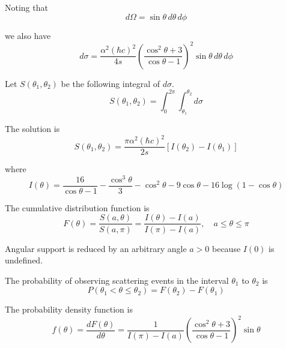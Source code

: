 Noting that
\begin{equation*}
d\Omega=\sin\theta\,d\theta\,d\phi
\end{equation*}

we also have
\begin{equation*}
d\sigma=\frac{\alpha^2(\hbar c)^2}{4s}
\left(\frac{\cos^2\theta+3}{\cos\theta-1}\right)^2
\sin\theta\,d\theta\,d\phi
\end{equation*}

Let $S(\theta_1,\theta_2)$ be the following integral of $d\sigma$.
\begin{equation*}
S(\theta_1,\theta_2)=\int_0^{2\pi}\int_{\theta_1}^{\theta_2}d\sigma
\end{equation*}

The solution is
\begin{equation*}
S(\theta_1,\theta_2)=\frac{\pi\alpha^2(\hbar c)^2}{2s}[I(\theta_2)-I(\theta_1)]
\end{equation*}

where
\begin{equation*}
I(\theta)=\frac{16}{\cos\theta-1}-\frac{\cos^3\theta}{3}-\cos^2\theta-9\cos\theta-16\log(1-\cos\theta)
\end{equation*}

The cumulative distribution function is
\begin{equation*}
F(\theta)
=\frac{S(a,\theta)}{S(a,\pi)}
=\frac{I(\theta)-I(a)}{I(\pi)-I(a)},
\quad
a\le\theta\le\pi
\end{equation*}

Angular support is reduced by an arbitrary angle $a>0$ because $I(0)$ is undefined.

\bigskip
The probability of observing scattering events in the interval $\theta_1$ to $\theta_2$ is
\begin{equation*}
P(\theta_1<\theta\le\theta_2)=F(\theta_2)-F(\theta_1)
\end{equation*}

The probability density function is
\begin{equation*}
f(\theta)=\frac{dF(\theta)}{d\theta}
=\frac{1}{I(\pi)-I(a)}
\left(\frac{\cos^2\theta+3}{\cos\theta-1}\right)^2
\sin\theta
\end{equation*}


